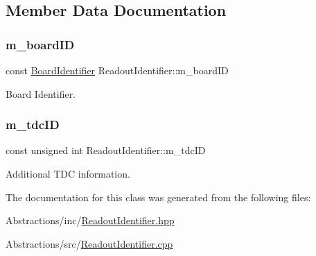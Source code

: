 \subsection{Member Data Documentation}
\mbox{\label{class_readout_identifier_ae866229661d1f335f0ef20e382020070}} 
\subsubsection{\texorpdfstring{m\+\_\+board\+ID}{m\_boardID}}
{\footnotesize\ttfamily const \hyperlink{class_board_identifier}{Board\+Identifier} Readout\+Identifier\+::m\+\_\+board\+ID\hspace{0.3cm}{\ttfamily [private]}}



Board Identifier. 

\mbox{\label{class_readout_identifier_a51c3175e53d5178fe8bba193c04052c4}} 
\subsubsection{\texorpdfstring{m\+\_\+tdc\+ID}{m\_tdcID}}
{\footnotesize\ttfamily const unsigned int Readout\+Identifier\+::m\+\_\+tdc\+ID\hspace{0.3cm}{\ttfamily [private]}}



Additional T\+DC information. 



The documentation for this class was generated from the following files\+:\begin{DoxyCompactItemize}
\item 
Abstractions/inc/\hyperlink{_readout_identifier_8hpp}{Readout\+Identifier.\+hpp}\item 
Abstractions/src/\hyperlink{_readout_identifier_8cpp}{Readout\+Identifier.\+cpp}\end{DoxyCompactItemize}
